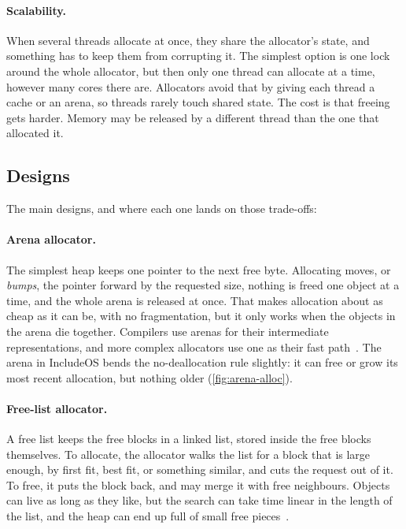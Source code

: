 \documentclass[12pt]{report}
\renewcommand{\_}{\origunderscore\allowbreak}
\begin{document}
\paragraph{Scalability.} When several threads allocate at once, they share the allocator's state, and something has to keep them from corrupting it. The simplest option is one lock around the whole allocator, but then only one thread can allocate at a time, however many cores there are. Allocators avoid that by giving each thread a cache or an arena, so threads rarely touch shared state. The cost is that freeing gets harder. Memory may be released by a different thread than the one that allocated it.

\subsection{Designs}

The main designs, and where each one lands on those trade-offs:

\paragraph{Arena allocator.} The simplest heap keeps one pointer to the next free byte. Allocating moves, or \emph{bumps}, the pointer forward by the requested size, nothing is freed one object at a time, and the whole arena is released at once. That makes allocation about as cheap as it can be, with no fragmentation, but it only works when the objects in the arena die together. Compilers use arenas for their intermediate representations, and more complex allocators use one as their fast path~\cite{wilson1995survey}. The arena in IncludeOS bends the no-deallocation rule slightly: it can free or grow its most recent allocation, but nothing older (\cref{fig:arena-alloc}).



\paragraph{Free-list allocator.} A free list keeps the free blocks in a linked list, stored inside the free blocks themselves. To allocate, the allocator walks the list for a block that is large enough, by first fit, best fit, or something similar, and cuts the request out of it. To free, it puts the block back, and may merge it with free neighbours. Objects can live as long as they like, but the search can take time linear in the length of the list, and the heap can end up full of small free pieces~\cite{knuth1968taocp}.
\end{document}
